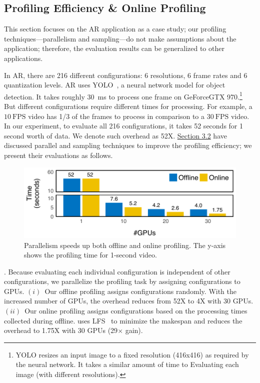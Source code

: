 \subsection{Profiling Efficiency \& Online Profiling}
\label{sec:online-profiling}

This section focuses on the AR application as a case study; our profiling
techniques---parallelism and sampling---do not make assumptions about the
application; therefore, the evaluation results can be generalized to other
applications.

In AR, there are 216 different configurations: 6 resolutions, 6 frame rates and
6 quantization levels. AR uses YOLO~\cite{redmon2016yolo9000}, a neural network
model for object detection. It takes roughly \SI{30}{\ms} to process one frame
on GeForce\textregistered\space GTX 970.\footnote{YOLO resizes an input image to
  a fixed resolution (416x416) as required by the neural network. It takes a
  similar amount of time to Evaluating each image (with different resolutions).}
But different configurations require different times for processing. For
example, a \(10~\text{FPS}\) video has 1/3 of the frames to process in
comparison to a \(30~\text{FPS}\) video.  In our experiment, to evaluate all 216
configurations, it takes 52 seconds for 1 second worth of data. We denote such
overhead as 52X\@. \hyperref[sec:automatic-profiling]{Section 3.2} have
discussed parallel and sampling techniques to improve the profiling efficiency;
we present their evaluations as follows.

\begin{figure}
  \centering
  \includegraphics[width=1.0\columnwidth]{figures/parallel.pdf}
  \caption{Parallelism speeds up both offline and online profiling.
  The y-axis shows the profiling time for 1-second video.}
  \label{fig:parallel}
  \vspace{-1em}
\end{figure}

. Because
evaluating each individual configuration is independent of other configurations,
we parallelize the profiling task by assigning configurations to GPUs.
$(i)$~Our offline profiling assigns configurations randomly.  With the increased
number of GPUs, the overhead reduces from 52X to 4X with 30 GPUs.  $(ii)$~Our
online profiling assigns configurations based on the processing times collected
during offline.  \sysname{} uses LFS~\cite{karger2010scheduling} to minimize the
makespan and reduces the overhead to 1.75X with 30 GPUs (29$\times$ gain).

